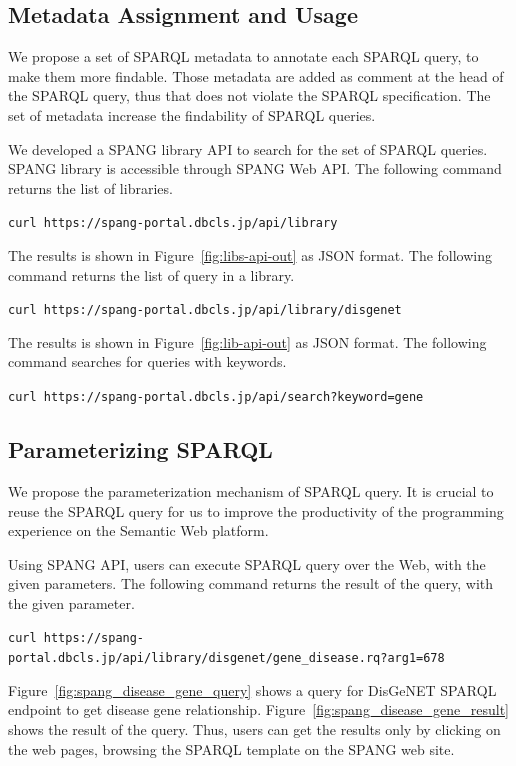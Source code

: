 \documentclass[runningheads]{llncs}
\begin{document}
\subsection{Metadata Assignment and Usage}

We propose a set of SPARQL metadata to annotate each SPARQL query, to make them more findable.
Those metadata are added as comment at the head of the SPARQL query, thus that does not violate the SPARQL specification. 
The set of metadata increase the findability of SPARQL queries.

We developed a SPANG library API to search for the set of SPARQL queries.
SPANG library is accessible through SPANG Web API.
The following command returns the list of libraries.

\texttt{curl https://spang-portal.dbcls.jp/api/library}

The results is shown in Figure~\ref{fig:libs-api-out} as JSON format.
The following command returns the list of query in a library.

\texttt{curl https://spang-portal.dbcls.jp/api/library/disgenet}

The results is shown in Figure~\ref{fig:lib-api-out} as JSON format.
The following command searches for queries with keywords.

\texttt{curl https://spang-portal.dbcls.jp/api/search?keyword=gene}


\subsection{Parameterizing SPARQL}

We propose the parameterization mechanism of SPARQL query. It is crucial to reuse the SPARQL query for us to improve the productivity of the programming experience on the Semantic Web platform.

Using SPANG API, users can execute SPARQL query over the Web, with the given parameters.
The following command returns the result of the query, with the given parameter.

\texttt{curl https://spang-portal.dbcls.jp/api/library/disgenet/gene\_disease.rq?arg1=678}


Figure~\ref{fig:spang_disease_gene_query} shows a query for DisGeNET SPARQL endpoint to get disease gene relationship. 
Figure~\ref{fig:spang_disease_gene_result} shows the result of the query. Thus, users can get the results only by clicking on the web pages, browsing the SPARQL template on the SPANG web site.
\end{document}

